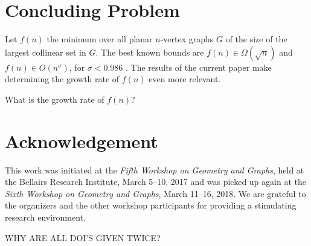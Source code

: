 \documentclass{patmorin}
\begin{document}
\section{Concluding Problem}

Let $f(n)$ the minimum over all planar $n$-vertex graphs $G$ of the
size of the largest collinear set in $G$.  The best known bounds are
$f(n)\in\Omega(\sqrt{n})$ and $f(n)\in O(n^\sigma)$, for $\sigma
< 0.986$ \cite{bose.dujmovic.ea:polynomial,ravsky.verbitsky:on}.
The results of the current paper make determining the growth rate of
$f(n)$ even more relevant.

\begin{op}
   What is the growth rate of $f(n)$?
\end{op}


\section*{Acknowledgement}

This work was initiated at the \emph{Fifth Workshop on Geometry and
Graphs}, held at the Bellairs Research Institute, March 5--10, 2017 and
was picked up again at the \emph{Sixth Workshop on Geometry and Graphs},
March 11--16, 2018.  We are grateful to the organizers and the other
workshop participants for providing a stimulating research environment.





WHY ARE ALL DOI'S GIVEN TWICE?

\end{document}
